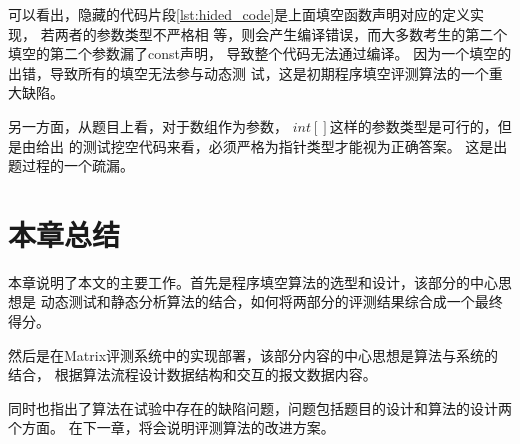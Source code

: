可以看出，隐藏的代码片段\ref{lst:hided_code}是上面填空函数声明对应的定义实现，
若两者的参数类型不严格相
等，则会产生编译错误，而大多数考生的第二个填空的第二个参数漏了const声明，
导致整个代码无法通过编译。
因为一个填空的出错，导致所有的填空无法参与动态测
试，这是初期程序填空评测算法的一个重大缺陷。

另一方面，从题目上看，对于数组作为参数，
$int[]$这样的参数类型是可行的，但是由给出
的测试挖空代码来看，必须严格为指针类型才能视为正确答案。
这是出题过程的一个疏漏。

\section{本章总结}
本章说明了本文的主要工作。首先是程序填空算法的选型和设计，该部分的中心思想是
动态测试和静态分析算法的结合，如何将两部分的评测结果综合成一个最终得分。

然后是在Matrix评测系统中的实现部署，该部分内容的中心思想是算法与系统的结合，
根据算法流程设计数据结构和交互的报文数据内容。

同时也指出了算法在试验中存在的缺陷问题，问题包括题目的设计和算法的设计两个方面。
在下一章，将会说明评测算法的改进方案。

\clearpage
